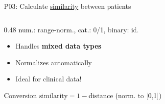 \documentclass[aspectratio=169, 10pt]{beamer}
\begin{document}
\begin{frame}{P03: Calculate \href{https://en.wikipedia.org/wiki/Similarity_measure}{similarity} between patients}
\begin{columns}[T]
\begin{column}{0.48\textwidth}
            \vspace{0.5mm}
            num.: range-norm., cat.: 0/1, binary: id.
            
            \vspace{1mm}
            \footnotesize
            \begin{itemize}\setlength{\itemsep}{0pt}
                \item Handles \textbf{mixed data types}
                \item Normalizes automatically
                \item Ideal for clinical data!
            \end{itemize}
            
            \begin{block}{\scriptsize Conversion}
                \scriptsize $\text{similarity} = 1 - \text{distance}$ (norm. to [0,1])
            \end{block}
        \end{column}
    \end{columns}
\end{frame}
\end{document}
